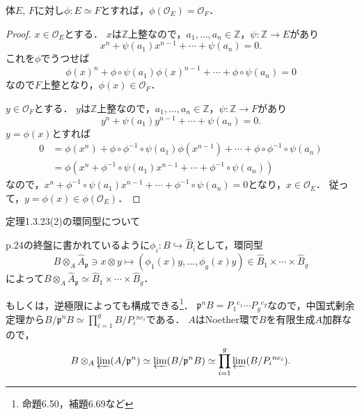 \begin{screen}
  \begin{lem}
    \label{iso_field_integral_closure}
    体$E$, $F$に対し$\phi \colon E \simeq F$とすれば，$\phi(\mathcal{O}_E) = \mathcal{O}_F$．
  \end{lem}
\end{screen}
\begin{proof}
  $x\in \mathcal{O}_E$とする．
  $x$は$\mathbb{Z}$上整なので，$a_1, \ldots, a_n \in \mathbb{Z}$，$\psi\colon\mathbb{Z}\to E$があり
  \[x^n + \psi(a_1)x^{n-1} + \cdots + \psi(a_n) = 0.\]
  これを$\phi$でうつせば
  \[\phi(x)^n + \phi\circ\psi(a_1)\phi(x)^{n-1} + \cdots + \phi\circ\psi(a_n) = 0\]
  なので$F$上整となり，$\phi(x) \in \mathcal{O}_F$．

  $y \in \mathcal{O}_F$とする．
  $y$は$\mathbb{Z}$上整なので，$a_1, \ldots, a_n \in \mathbb{Z}$，$\psi\colon\mathbb{Z}\to F$があり
  \[y^n + \psi(a_1)y^{n-1} + \cdots + \psi(a_n) = 0.\]
  $y = \phi(x)$とすれば
  \begin{align*}
    0 &= \phi(x^n) + \phi\circ\phi^{-1}\circ\psi(a_1) \phi(x^{n-1}) + \cdots + \phi\circ\phi^{-1}\circ\psi(a_n) \\
      &= \phi \left( x^n + \phi^{-1}\circ\psi(a_1) x^{n-1} + \cdots + \phi^{-1}\circ\psi(a_n) \right)
  \end{align*}
  なので，$x^n + \phi^{-1}\circ\psi(a_1) x^{n-1} + \cdots + \phi^{-1}\circ\psi(a_n) = 0$となり，$x \in \mathcal{O}_E$．
  従って，$y = \phi(x) \in \phi(\mathcal{O}_E)$．
\end{proof}

\begin{screen}
  \begin{thm}
    \label{Thm_1_3_23_2}
    定理1.3.23(2)の環同型について
  \end{thm}
\end{screen}
p.24の終盤に書かれているように$\phi_i\colon B\hookrightarrow\widehat{B}_i$として，環同型
\[B\otimes_A\widehat{A}_\mathfrak{p}\ni x \otimes y\mapsto(\phi_1(x)y, \ldots, \phi_g(x)y)\in\widehat{B}_1\times\cdots\times\widehat{B}_g\]
によって$B\otimes_A\widehat{A}_\mathfrak{p}\simeq\widehat{B}_1\times\cdots\times\widehat{B}_g$．

もしくは，逆極限によっても構成できる\footnote{\cite{加藤和也2005数論}命題6.50，補題6.69など}．
$\mathfrak{p}^nB = P_1{}^{e_1} \cdots P_g{}^{e_g}$なので，中国式剰余定理から$B/\mathfrak{p}^nB \simeq \prod_{i = 1}^g B/P_i{}^{ne_i}$である．
$A$はNoether環で$B$を有限生成$A$加群なので，
\[ B \otimes_A \varprojlim (A/\mathfrak{p}^n) \simeq \varprojlim(B/\mathfrak{p}^nB) \simeq \prod_{i = 1}^g \varprojlim (B/P_i{}^{ne_i}). \]

